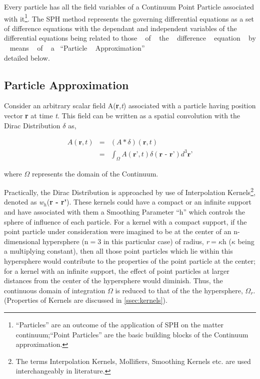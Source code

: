 Every particle has all the field variables of a Continuum Point Particle associated with it\footnote{``Particles'' are an outcome of the application of SPH on the matter continuum;``Point Particles'' are the basic building blocks of the Continuum approximation.}. The SPH method represents the governing differential equations as a set of difference equations with the dependant and independent variables of the differential equations being related to those ~ of ~ the ~ difference ~ equation ~ by ~ means ~ of ~ a ~``Particle ~ Approximation'' ~ \cite{sph:volieu}\\\cite{liu_liu} detailed below.

\subsection{Particle Approximation}\label{kappa}

Consider an arbitrary scalar field A(\textbf{r},\textit{t}) associated with a particle having position vector \textbf{r} at time \textit{t}. This field can be written as a spatial convolution with the Dirac Distribution $\delta$ as, 

\begin{eqnarray} \label{eq:dirac}
 A(\textbf{r},\textit{t}) &=& (A\ast \delta)(\textbf{r},t) \nonumber \\
                          &=& \int_{\varOmega} A(\textbf{r'},t) \delta (\textbf{r - r'}) d^{3}\textbf{r'} 
\end{eqnarray}

where $\varOmega$ represents the domain of the Continuum. 

Practically, the Dirac Distribution is approached by use of Interpolation Kernels\footnote{The terms Interpolation Kernels, Mollifiers, Smoothing Kernels etc. are used interchangeably in literature.}, denoted as \textit{w$_h$}(\textbf{r - r'}). These kernels could have a compact or an infinite support and have associated with them a Smoothing Parameter ``h'' which controls the sphere of influence of each particle. For a kernel with a compact support, if the point particle under consideration were imagined to be at the center of an n-dimensional hypersphere (n$=$3 in this particular case) of radius, \textit{r}$=\kappa$h ($\kappa$ being a multiplying constant), then all those point particles which lie within this hypersphere would contribute to the properties of the point particle at the center; for a kernel with an infinite support, the effect of point particles at larger distances from the center of the hypersphere would diminish. Thus, the continuous domain of integration $\varOmega$ is reduced to that of the the hypersphere, $\varOmega_r$. (Properties of Kernels are discussed in \ref{ssec:kernels}). 


